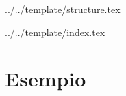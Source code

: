 


\def\DOCUMENTO{<Nome documento>}
\def\VERSIONE{1.0.0}

\def\DESCRIZIONE{<Info documento}

\def\REDATTORE {<Redattore>}
\def\VERIFICATORE {<Verificatore>}
\def\RESPONSABILE {<Responsabile>}

\def\USO {<Uso>}

\def\DISTRIBUZIONE {\GRUPPO{}\\ & \COMMITTENTE{}\\}

\def\DESCRIZIONE {<Descrizione>}


\def\INDICE	{true}
\def\TABELLE {true}
\def\FIGURE {true}


 {../../template/structure.tex}


 {../../template/index.tex}


\section{Esempio}






